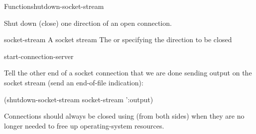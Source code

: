 \documentclass[10pt,twoside,english,pdftex]{article}
\begin{document}

\begin{functiondoc}{Function}{shutdown-socket-stream}%
  {}
%
%

\fnsyntax

\fnpurpose Shut down (close) one direction of an open connection.

\fnpackage {}

\fnmodule {}

\fnargs
\begin{args}{socket-stream}
 A socket stream
\arg[direction] The   or 
 specifying the direction to be closed
\end{args}

\begin{alsos}{start-connection-server}
\end{alsos}

\fnexample
Tell the other end of a socket connection that we are done sending
output on the socket stream (send an end-of-file indication):
%
\W\supp
\begin{example}
  (shutdown-socket-stream socket-stream ':output)
\end{example}

\fnnote Connections should always be closed using  (from
both sides) when they are no longer needed to free up operating-system
resources.

\end{functiondoc}

\end{document}
